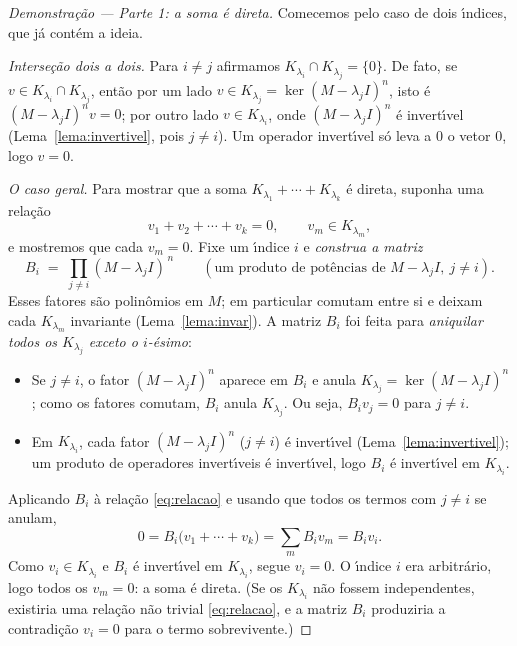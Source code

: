 \documentclass[11pt,a4paper]{amsart}
\theoremstyle{plain}
\theoremstyle{definition}
\theoremstyle{remark}
\begin{document}
\begin{proof}[Demonstra\c{c}\~ao --- Parte 1: a soma \'e direta]
Comecemos pelo caso de dois \'\i ndices, que j\'a cont\'em a ideia.

\emph{Interse\c{c}\~ao dois a dois.} Para $i\neq j$ afirmamos
$K_{\lambda_i}\cap K_{\lambda_j}=\{0\}$. De fato, se
$v\in K_{\lambda_i}\cap K_{\lambda_j}$, ent\~ao por um lado
$v\in K_{\lambda_j}=\ker(M-\lambda_j I)^n$, isto \'e $(M-\lambda_j I)^n v=0$;
por outro lado $v\in K_{\lambda_i}$, onde $(M-\lambda_j I)^n$ \'e invert\'\i vel
(Lema~\ref{lema:invertivel}, pois $j\neq i$). Um operador invert\'\i vel s\'o
leva a $0$ o vetor $0$, logo $v=0$.

\emph{O caso geral.} Para mostrar que a soma
$K_{\lambda_1}+\cdots+K_{\lambda_k}$ \'e direta, suponha uma rela\c{c}\~ao
\begin{equation}\label{eq:relacao}
  v_1 + v_2 + \cdots + v_k = 0,
  \qquad v_m\in K_{\lambda_m},
\end{equation}
e mostremos que cada $v_m=0$. Fixe um \'\i ndice $i$ e \emph{construa a matriz}
\[
  B_i \;=\; \prod_{j\neq i}(M-\lambda_j I)^{\,n}
  \qquad(\text{um produto de pot\^encias de }M-\lambda_j I,\ j\neq i).
\]
Esses fatores s\~ao polin\^omios em $M$; em particular comutam entre si e
deixam cada $K_{\lambda_m}$ invariante (Lema~\ref{lema:invar}). A matriz $B_i$
foi feita para \emph{aniquilar todos os $K_{\lambda_j}$ exceto o $i$-\'esimo}:
\begin{itemize}[leftmargin=1.6em,topsep=2pt]
  \item Se $j\neq i$, o fator $(M-\lambda_j I)^n$ aparece em $B_i$ e anula
        $K_{\lambda_j}=\ker(M-\lambda_j I)^n$; como os fatores comutam,
        $B_i$ anula $K_{\lambda_j}$. Ou seja, $B_i v_j = 0$ para $j\neq i$.
  \item Em $K_{\lambda_i}$, cada fator $(M-\lambda_j I)^n$ ($j\neq i$) \'e
        invert\'\i vel (Lema~\ref{lema:invertivel}); um produto de operadores
        invert\'\i veis \'e invert\'\i vel, logo $B_i$ \'e invert\'\i vel em
        $K_{\lambda_i}$.
\end{itemize}
Aplicando $B_i$ \`a rela\c{c}\~ao \eqref{eq:relacao} e usando que todos os
termos com $j\neq i$ se anulam,
\[
  0 = B_i\big(v_1+\cdots+v_k\big) = \sum_{m} B_i v_m = B_i v_i .
\]
Como $v_i\in K_{\lambda_i}$ e $B_i$ \'e invert\'\i vel em $K_{\lambda_i}$, segue
$v_i=0$. O \'\i ndice $i$ era arbitr\'ario, logo todos os $v_m=0$: a soma \'e
direta. (Se os $K_{\lambda_i}$ n\~ao fossem independentes, existiria uma
rela\c{c}\~ao n\~ao trivial \eqref{eq:relacao}, e a matriz $B_i$ produziria a
contradi\c{c}\~ao $v_i=0$ para o termo sobrevivente.)
\end{proof}
\end{document}
